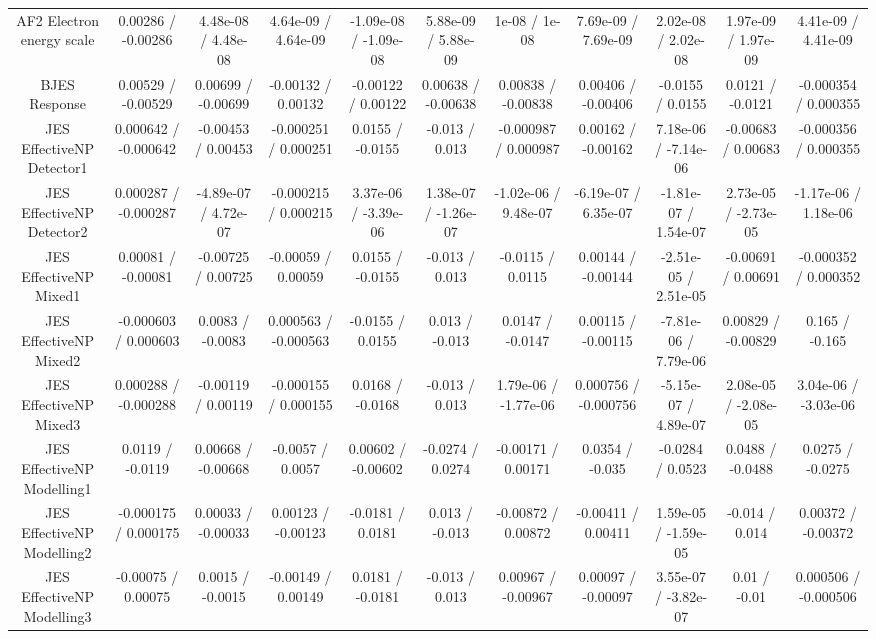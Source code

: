 \begin{table}[htbp]
\begin{center}
\begin{tabular}{|c|c|c|c|c|c|c|c|c|c|c|}
  AF2 Electron energy scale & 0.00286 / -0.00286 & 4.48e-08 / 4.48e-08 & 4.64e-09 / 4.64e-09 & -1.09e-08 / -1.09e-08 & 5.88e-09 / 5.88e-09 & 1e-08 / 1e-08 & 7.69e-09 / 7.69e-09 & 2.02e-08 / 2.02e-08 & 1.97e-09 / 1.97e-09 & 4.41e-09 / 4.41e-09 \\ 
  BJES Response & 0.00529 / -0.00529 & 0.00699 / -0.00699 & -0.00132 / 0.00132 & -0.00122 / 0.00122 & 0.00638 / -0.00638 & 0.00838 / -0.00838 & 0.00406 / -0.00406 & -0.0155 / 0.0155 & 0.0121 / -0.0121 & -0.000354 / 0.000355 \\ 
  JES EffectiveNP Detector1 & 0.000642 / -0.000642 & -0.00453 / 0.00453 & -0.000251 / 0.000251 & 0.0155 / -0.0155 & -0.013 / 0.013 & -0.000987 / 0.000987 & 0.00162 / -0.00162 & 7.18e-06 / -7.14e-06 & -0.00683 / 0.00683 & -0.000356 / 0.000355 \\ 
  JES EffectiveNP Detector2 & 0.000287 / -0.000287 & -4.89e-07 / 4.72e-07 & -0.000215 / 0.000215 & 3.37e-06 / -3.39e-06 & 1.38e-07 / -1.26e-07 & -1.02e-06 / 9.48e-07 & -6.19e-07 / 6.35e-07 & -1.81e-07 / 1.54e-07 & 2.73e-05 / -2.73e-05 & -1.17e-06 / 1.18e-06 \\ 
  JES EffectiveNP Mixed1 & 0.00081 / -0.00081 & -0.00725 / 0.00725 & -0.00059 / 0.00059 & 0.0155 / -0.0155 & -0.013 / 0.013 & -0.0115 / 0.0115 & 0.00144 / -0.00144 & -2.51e-05 / 2.51e-05 & -0.00691 / 0.00691 & -0.000352 / 0.000352 \\ 
  JES EffectiveNP Mixed2 & -0.000603 / 0.000603 & 0.0083 / -0.0083 & 0.000563 / -0.000563 & -0.0155 / 0.0155 & 0.013 / -0.013 & 0.0147 / -0.0147 & 0.00115 / -0.00115 & -7.81e-06 / 7.79e-06 & 0.00829 / -0.00829 & 0.165 / -0.165 \\ 
  JES EffectiveNP Mixed3 & 0.000288 / -0.000288 & -0.00119 / 0.00119 & -0.000155 / 0.000155 & 0.0168 / -0.0168 & -0.013 / 0.013 & 1.79e-06 / -1.77e-06 & 0.000756 / -0.000756 & -5.15e-07 / 4.89e-07 & 2.08e-05 / -2.08e-05 & 3.04e-06 / -3.03e-06 \\ 
  JES EffectiveNP Modelling1 & 0.0119 / -0.0119 & 0.00668 / -0.00668 & -0.0057 / 0.0057 & 0.00602 / -0.00602 & -0.0274 / 0.0274 & -0.00171 / 0.00171 & 0.0354 / -0.035 & -0.0284 / 0.0523 & 0.0488 / -0.0488 & 0.0275 / -0.0275 \\ 
  JES EffectiveNP Modelling2 & -0.000175 / 0.000175 & 0.00033 / -0.00033 & 0.00123 / -0.00123 & -0.0181 / 0.0181 & 0.013 / -0.013 & -0.00872 / 0.00872 & -0.00411 / 0.00411 & 1.59e-05 / -1.59e-05 & -0.014 / 0.014 & 0.00372 / -0.00372 \\ 
  JES EffectiveNP Modelling3 & -0.00075 / 0.00075 & 0.0015 / -0.0015 & -0.00149 / 0.00149 & 0.0181 / -0.0181 & -0.013 / 0.013 & 0.00967 / -0.00967 & 0.00097 / -0.00097 & 3.55e-07 / -3.82e-07 & 0.01 / -0.01 & 0.000506 / -0.000506 \\ 

\end{tabular}
\end{center}
\end{table}
